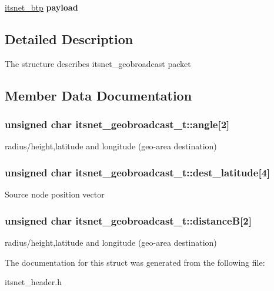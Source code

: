 \begin{DoxyCompactItemize}
\item 
\hypertarget{structitsnet__geobroadcast__t_a83aff395a7907a1e8bb7200e62802321}{\hyperlink{structitsnet__btp}{itsnet\-\_\-btp} {\bfseries payload}}\label{structitsnet__geobroadcast__t_a83aff395a7907a1e8bb7200e62802321}

\end{DoxyCompactItemize}


\subsection{\-Detailed \-Description}
\-The structure describes itsnet\-\_\-geobroadcast packet 

\subsection{\-Member \-Data \-Documentation}
\hypertarget{structitsnet__geobroadcast__t_ad01fb56d9a376337c02d140df82877c4}{
\subsubsection[{angle}]{\setlength{\rightskip}{0pt plus 5cm}unsigned char {\bf itsnet\-\_\-geobroadcast\-\_\-t\-::angle}\mbox{[}2\mbox{]}}}\label{structitsnet__geobroadcast__t_ad01fb56d9a376337c02d140df82877c4}
radius/height,latitude and longitude (geo-\/area destination) \hypertarget{structitsnet__geobroadcast__t_a12f315d101954aa288cfc80d5724e822}{
\subsubsection[{dest\-\_\-latitude}]{\setlength{\rightskip}{0pt plus 5cm}unsigned char {\bf itsnet\-\_\-geobroadcast\-\_\-t\-::dest\-\_\-latitude}\mbox{[}4\mbox{]}}}\label{structitsnet__geobroadcast__t_a12f315d101954aa288cfc80d5724e822}
\-Source node position vector \hypertarget{structitsnet__geobroadcast__t_a6671b5efdf17e4669fa67097f0745bbc}{
\subsubsection[{distance\-B}]{\setlength{\rightskip}{0pt plus 5cm}unsigned char {\bf itsnet\-\_\-geobroadcast\-\_\-t\-::distance\-B}\mbox{[}2\mbox{]}}}\label{structitsnet__geobroadcast__t_a6671b5efdf17e4669fa67097f0745bbc}
radius/height,latitude and longitude (geo-\/area destination) 

\-The documentation for this struct was generated from the following file\-:\begin{DoxyCompactItemize}
\item 
itsnet\-\_\-header.\-h\end{DoxyCompactItemize}
